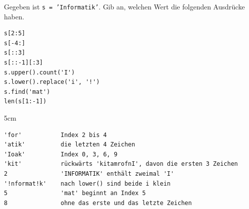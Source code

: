 \question[4]
Gegeben ist \texttt{s = 'Informatik'}. Gib an, welchen Wert die folgenden Ausdrücke haben.

\begin{lstlisting}
s[2:5]
s[-4:]
s[::3]
s[::-1][:3]
s.upper().count('I')
s.lower().replace('i', '!')
s.find('mat')
len(s[1:-1])
\end{lstlisting}

\begin{solutionbox}{5cm}
\begin{lstlisting}[language={}]
'for'           Index 2 bis 4
'atik'          die letzten 4 Zeichen
'Ioak'          Index 0, 3, 6, 9
'kit'           rückwärts 'kitamrofnI', davon die ersten 3 Zeichen
2               'INFORMATIK' enthält zweimal 'I'
'!nformat!k'    nach lower() sind beide i klein
5               'mat' beginnt an Index 5
8               ohne das erste und das letzte Zeichen
\end{lstlisting}
\end{solutionbox}
